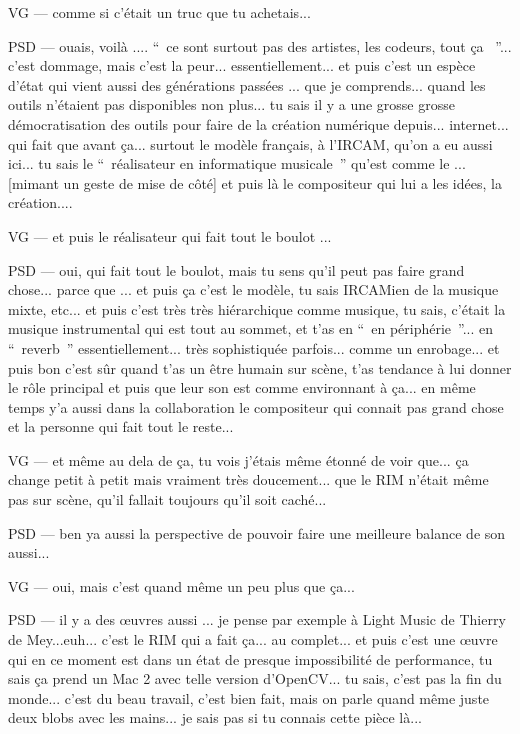 VG — comme si c'était un truc que tu achetais... 

PSD — ouais, voilà .... “ ce sont surtout pas des artistes, les codeurs, tout ça  ”... c'est dommage, mais c'est la peur... essentiellement... et puis c'est un espèce d'état qui vient aussi des générations passées ... que je comprends... quand les outils n'étaient pas disponibles non plus... tu sais il y a une grosse grosse démocratisation des outils pour faire de la création numérique depuis... internet... qui fait que avant ça... surtout le modèle français, à l'IRCAM, qu'on a eu aussi ici... tu sais le “ réalisateur en informatique musicale ” qu'est comme le ... [mimant un geste de mise de côté] et puis là le compositeur qui lui a les idées, la création.... 

VG — et puis le réalisateur qui fait tout le boulot ... 

PSD — oui, qui fait tout le boulot, mais tu sens qu'il peut pas faire grand chose... parce que ... et puis ça c'est le modèle, tu sais IRCAMien de la musique mixte, etc... et puis c'est très très hiérarchique comme musique, tu sais, c'était la musique instrumental qui est tout au sommet, et t'as en “ en périphérie ”... en “ reverb ” essentiellement... très sophistiquée parfois... comme un enrobage... et puis bon c'est sûr quand t'as un être humain sur scène, t'as tendance à lui donner le rôle principal et puis que leur son est comme environnant à ça... en même temps y'a aussi dans la collaboration le compositeur qui connait pas grand chose et la personne qui fait tout le reste... 

VG — et même au dela de ça, tu vois j'étais même étonné de voir que... ça change petit à petit mais vraiment très doucement... que le RIM n'était même pas sur scène, qu'il fallait toujours qu'il soit caché... 

PSD — ben ya aussi la perspective de pouvoir faire une meilleure balance de son aussi... 

VG — oui, mais c'est quand même un peu plus que ça... 

PSD — il y a des œuvres aussi ... je pense par exemple à Light Music de Thierry de Mey...euh... c'est le RIM qui a fait ça... au complet... et puis c'est une œuvre qui en ce moment est dans un état de presque impossibilité de performance, tu sais ça prend un Mac 2 avec telle version d'OpenCV... tu sais, c'est pas la fin du monde... c'est du beau travail, c'est bien fait, mais on parle quand même juste deux blobs avec les mains... je sais pas si tu connais cette pièce là... 

